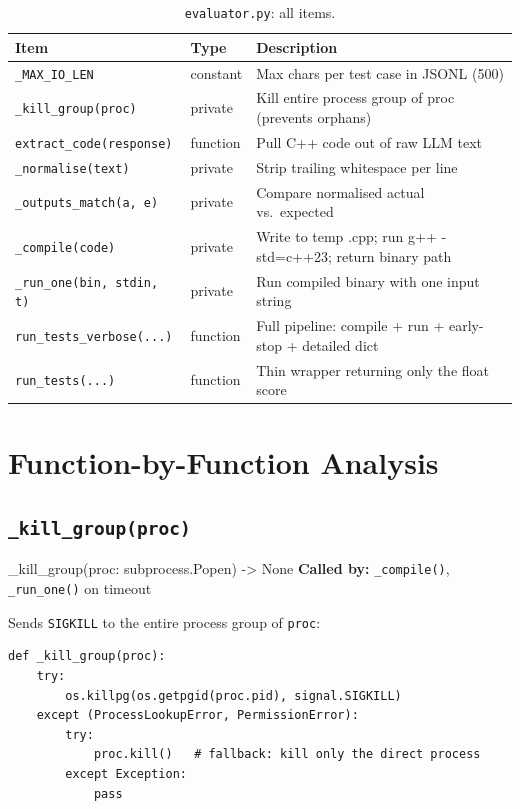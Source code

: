 \documentclass[11pt,a4paper]{report}
\newcommand{\pyfile}[1]{\texttt{#1}}
\newcommand{\fn}[1]{\texttt{#1}}
\begin{document}
\begin{table}[h]
\centering
\begin{tabular}{@{}llp{8cm}@{}}
\toprule
\textbf{Item} & \textbf{Type} & \textbf{Description} \\
\midrule
\fn{\_MAX\_IO\_LEN}           & constant & Max chars per test case in JSONL (500) \\
\fn{\_kill\_group(proc)}      & private  & Kill entire process group of proc (prevents orphans) \\
\fn{extract\_code(response)}  & function & Pull C++ code out of raw LLM text \\
\fn{\_normalise(text)}        & private  & Strip trailing whitespace per line \\
\fn{\_outputs\_match(a, e)}   & private  & Compare normalised actual vs.\ expected \\
\fn{\_compile(code)}          & private  & Write to temp .cpp; run g++ -std=c++23; return binary path \\
\fn{\_run\_one(bin, stdin, t)} & private & Run compiled binary with one input string \\
\fn{run\_tests\_verbose(...)}  & function & Full pipeline: compile + run + early-stop + detailed dict \\
\fn{run\_tests(...)}           & function & Thin wrapper returning only the float score \\
\bottomrule
\end{tabular}
\caption{\pyfile{evaluator.py}: all items.}
\end{table}

\section{Function-by-Function Analysis}

\subsection{\fn{\_kill\_group(proc)}}

\begin{specbox}{\_kill\_group(proc: subprocess.Popen) -> None}
\textbf{Called by:} \fn{\_compile()}, \fn{\_run\_one()} on timeout
\end{specbox}

Sends \fn{SIGKILL} to the entire process group of \fn{proc}:
\begin{lstlisting}[style=example]
def _kill_group(proc):
    try:
        os.killpg(os.getpgid(proc.pid), signal.SIGKILL)
    except (ProcessLookupError, PermissionError):
        try:
            proc.kill()   # fallback: kill only the direct process
        except Exception:
            pass
\end{lstlisting}
\end{document}
